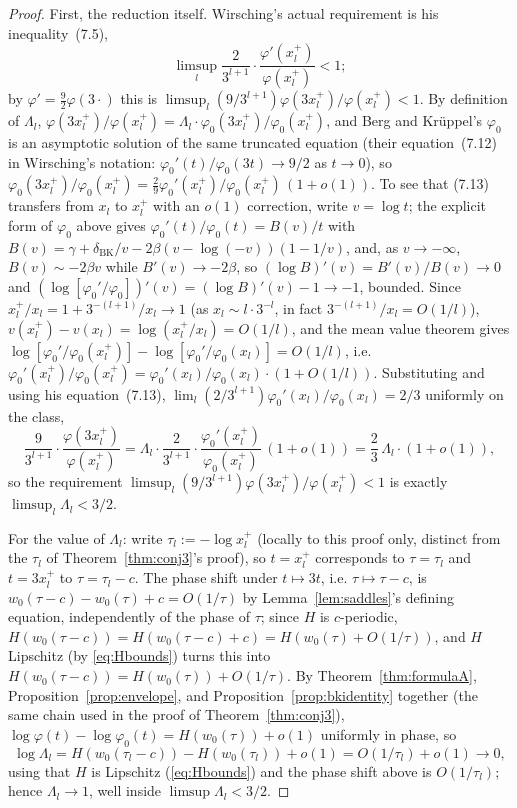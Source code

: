 \documentclass[11pt]{amsart}
\theoremstyle{plain}
\theoremstyle{definition}
\theoremstyle{remark}
\begin{document}
\begin{proof}
First, the reduction itself. Wirsching's actual requirement is his inequality~(7.5),
\[
\limsup_l \frac{2}{3^{l+1}}\cdot\frac{\varphi'(x_l^+)}{\varphi(x_l^+)} < 1;
\]
by $\varphi'=\tfrac92\varphi(3\cdot)$ this is $\limsup_l (9/3^{l+1})\varphi(3x_l^+)/\varphi(x_l^+) <
1$. By definition of $\Lambda_l$,
$\varphi(3x_l^+)/\varphi(x_l^+) = \Lambda_l\cdot\varphi_0(3x_l^+)/\varphi_0(x_l^+)$, and Berg and
Kr\"uppel's $\varphi_0$ is an asymptotic solution of the same truncated equation (their
equation~(7.12) in Wirsching's notation: $\varphi_0'(t)/\varphi_0(3t)\to9/2$ as $t\to0$), so
$\varphi_0(3x_l^+)/\varphi_0(x_l^+) = \tfrac29\varphi_0'(x_l^+)/\varphi_0(x_l^+)\,(1+o(1))$.
To see that (7.13) transfers from $x_l$ to $x_l^+$ with an $o(1)$ correction, write $v=\log t$; the
explicit form of $\varphi_0$ above gives $\varphi_0'(t)/\varphi_0(t) = B(v)/t$ with
$B(v) = \gamma+\delta_{\mathrm{BK}}/v-2\beta(v-\log(-v))(1-1/v)$, and, as $v\to-\infty$,
$B(v)\sim-2\beta v$ while $B'(v)\to-2\beta$, so $(\log B)'(v)=B'(v)/B(v)\to0$ and
$(\log[\varphi_0'/\varphi_0])'(v) = (\log B)'(v)-1 \to -1$, bounded. Since $x_l^+/x_l = 1+3^{-(l+1)}/x_l
\to 1$ (as $x_l\sim l\cdot3^{-l}$, in fact $3^{-(l+1)}/x_l=O(1/l)$), $v(x_l^+)-v(x_l)=\log(x_l^+/x_l)
=O(1/l)$, and the mean value theorem gives
$\log[\varphi_0'/\varphi_0(x_l^+)]-\log[\varphi_0'/\varphi_0(x_l)]=O(1/l)$, i.e.
$\varphi_0'(x_l^+)/\varphi_0(x_l^+)=\varphi_0'(x_l)/\varphi_0(x_l)\cdot(1+O(1/l))$. Substituting and
using his equation~(7.13),
$\lim_l(2/3^{l+1})\varphi_0'(x_l)/\varphi_0(x_l)=2/3$ uniformly on the class,
\[
\frac{9}{3^{l+1}}\cdot\frac{\varphi(3x_l^+)}{\varphi(x_l^+)}
= \Lambda_l\cdot\frac2{3^{l+1}}\cdot\frac{\varphi_0'(x_l^+)}{\varphi_0(x_l^+)}\,(1+o(1))
= \frac23\,\Lambda_l\cdot(1+o(1)),
\]
so the requirement $\limsup_l(9/3^{l+1})\varphi(3x_l^+)/\varphi(x_l^+)<1$ is exactly
$\limsup_l\Lambda_l<3/2$.

For the value of $\Lambda_l$: write $\tau_l := -\log x_l^+$ (locally to this proof only, distinct
from the $\tau_l$ of Theorem~\ref{thm:conj3}'s proof), so $t=x_l^+$ corresponds to $\tau=\tau_l$
and $t=3x_l^+$ to $\tau=\tau_l-c$. The phase shift under $t\mapsto3t$, i.e. $\tau\mapsto\tau-c$, is
$w_0(\tau-c)-w_0(\tau)+c = O(1/\tau)$ by Lemma~\ref{lem:saddles}'s defining equation, independently
of the phase of $\tau$; since $H$ is $c$-periodic, $H(w_0(\tau-c)) = H(w_0(\tau-c)+c) =
H(w_0(\tau)+O(1/\tau))$, and $H$ Lipschitz (by \eqref{eq:Hbounds}) turns this into
$H(w_0(\tau-c)) = H(w_0(\tau)) + O(1/\tau)$. By Theorem~\ref{thm:formulaA},
Proposition~\ref{prop:envelope}, and Proposition~\ref{prop:bkidentity} together (the same chain used
in the proof of Theorem~\ref{thm:conj3}), $\log\varphi(t)-\log\varphi_0(t) = H(w_0(\tau)) + o(1)$
uniformly in phase, so
\[
\log\Lambda_l = H(w_0(\tau_l-c)) - H(w_0(\tau_l)) + o(1) = O(1/\tau_l) + o(1) \to 0,
\]
using that $H$ is Lipschitz (\eqref{eq:Hbounds}) and the phase shift above is $O(1/\tau_l)$; hence
$\Lambda_l \to 1$, well inside $\limsup \Lambda_l < 3/2$.
\end{proof}
\end{document}
